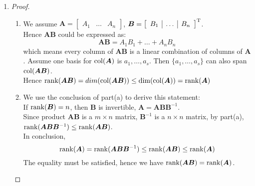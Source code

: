 \begin{enumerate}
\begin{proof}
\[\]
Assume one basis for $\range(\bm A)$ is $\{a_1,\dots,a_s\}$; $\bm B = \left[\begin{array}{c|c|c}
B_1&\dots&B_n
\end{array}\right]$ one basis for $\range(\bm B)$ is $\{b_1,\dots,b_t\}$. Thus we obtain:
\[
\begin{aligned}
\dim(\range(\bm A)+\range(\bm B))&=\dim(a_1,\dots,a_s,b_1,\dots,b_t)\\&\le s+t\\&=\dim(\range(\bm A))+\dim(\range(\bm B))\\&=\rank(\bm A)+\rank(\bm B)
\end{aligned}
\]
Hence we have 
\[
\begin{aligned}
\rank(\bm{A+B}) &= \dim(\range(\bm{A+B}))\\
&\le\dim(\range(\bm A)+\range(\bm B))\\
&\le\rank(\bm A)+\rank(\bm B)
\end{aligned}
\]
\end{proof}
\item
\begin{proof}
\begin{enumerate}
\item
We assume $\bm{A} = \left[\begin{array}{c|c|c}
A_1&\dots&A_n
\end{array}\right]$, $\bm{B} = \left[\begin{array}{c|c|c}
B_1&\dots&B_n
\end{array}\right]^{\mathrm T}$.
\\Hence $\bm{AB}$ could be expressed as:
\[
\bm{AB} = A_1B_1+\dots+A_nB_n
\]
which means every column of $\bm{AB}$ is a linear combination of columns of $\bm A$. Assume one basis for $\operatorname{col}(\bm A)$ is $a_1,\dots,a_s$. Then $\{a_1,\dots,a_s\}$ can also span $\operatorname{col}(\bm{AB})$. 
\\Hence $\operatorname{rank}(\bm{AB})=dim(\operatorname{col}(\bm{AB}))\le\dim(\operatorname{col}(\bm A))=\operatorname{rank}(\bm A)$
\item
We use the conclusion of part(a) to derive this statement:\\
If $\operatorname{rank}(\bm B)=n$, then $\bm B$ is invertible, $\bm A = \bm{AB}\bm B^{-1}$.\\
Since product $\bm{AB}$ is a $m\times n$ matrix, $\bm B^{-1}$ is a $n\times n$ matrix, by part(a), $\operatorname{rank}(\bm{AB}\bm B^{-1})\le\operatorname{rank}(\bm{AB})$.\\
In conclusion,
\[
\operatorname{rank}(\bm A) = \operatorname{rank}(\bm{AB}\bm B^{-1})\le\operatorname{rank}(\bm{AB})\le\operatorname{rank}(\bm A)
\]
The equality must be satisfied, hence we have $\operatorname{rank}(\bm{AB})=\operatorname{rank}(\bm A)$.

\end{enumerate}
\end{proof}
\end{enumerate}
